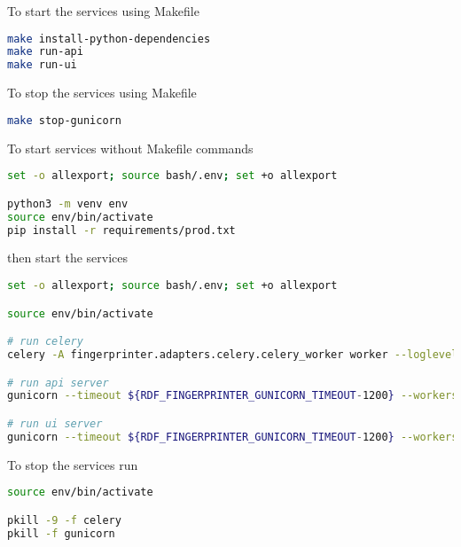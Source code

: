 To start the services using Makefile

\begin{lstlisting}[language=bash,]
make install-python-dependencies
make run-api
make run-ui
\end{lstlisting}

To stop the services using Makefile

\begin{lstlisting}[language=bash,]
make stop-gunicorn
\end{lstlisting}

To start services without Makefile commands

\begin{lstlisting}[language=bash,]
set -o allexport; source bash/.env; set +o allexport

python3 -m venv env
source env/bin/activate
pip install -r requirements/prod.txt
\end{lstlisting}

then start the services

\begin{lstlisting}[language=bash,]
set -o allexport; source bash/.env; set +o allexport

source env/bin/activate

# run celery
celery -A fingerprinter.adapters.celery.celery_worker worker --loglevel ${RDF_FINGERPRINTER_LOG_LEVEL} --logfile ${RDF_FINGERPRINTER_CELERY_LOGS} --detach

# run api server
gunicorn --timeout ${RDF_FINGERPRINTER_GUNICORN_TIMEOUT-1200} --workers ${RDF_FINGERPRINTER_GUNICORN_API_WORKERS-2} --bind 0.0.0.0:${RDF_FINGERPRINTER_API_PORT} --reload --log-file ${RDF_FINGERPRINTER_API_LOGS} --log-level ${RDF_FINGERPRINTER_LOG_LEVEL} fingerprinter.entrypoints.api.run:app --daemon

# run ui server
gunicorn --timeout ${RDF_FINGERPRINTER_GUNICORN_TIMEOUT-1200} --workers ${RDF_FINGERPRINTER_GUNICORN_UI_WORKERS-1} --bind 0.0.0.0:${RDF_FINGERPRINTER_UI_PORT} --reload --log-file ${RDF_FINGERPRINTER_UI_LOGS} --log-level ${RDF_FINGERPRINTER_LOG_LEVEL} fingerprinter.entrypoints.ui.run:app --daemon
\end{lstlisting}

To stop the services run

\begin{lstlisting}[language=bash,]
source env/bin/activate

pkill -9 -f celery
pkill -f gunicorn
\end{lstlisting}